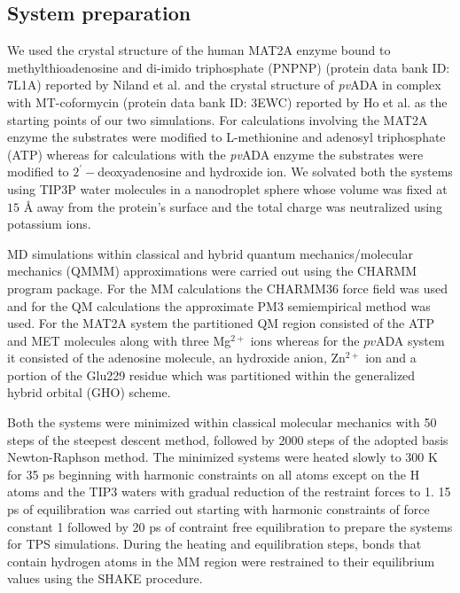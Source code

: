 \documentclass[journal=jpcbfk,manuscript=article,layout=traditional]{achemso}
\begin{document}
\subsection{System preparation}
We used the crystal structure of the human MAT2A enzyme 
bound to methylthioadenosine and di-imido triphosphate (PNPNP)
(protein data bank ID: 7L1A) reported by Niland 
et al. \cite{Niland21Biochem60p791} and the crystal structure of \textit{pv}ADA 
in complex with MT-coformycin (protein data bank ID: 3EWC) reported by Ho et 
al. \cite{Ho09Biochemistry48p9618} as the starting points of our two 
simulations. For calculations involving the MAT2A enzyme the substrates were modified to 
L-methionine and adenosyl triphosphate (ATP) whereas for calculations with the \textit{pv}ADA
enzyme the substrates were modified to $2^{'}-$deoxyadenosine and hydroxide ion. 
We solvated both the systems using TIP3P water molecules 
in a nanodroplet sphere whose volume was fixed at $15$ {\AA}
away from the protein's surface and the total charge was neutralized 
using potassium ions. 

MD simulations within classical and hybrid quantum mechanics/molecular mechanics 
(QMMM) approximations were carried out using the CHARMM program 
package. \cite{Brooks83JComputChem4p187,Brooks09JComputChem30p1545} 
For the MM calculations the CHARMM36 force field \cite{Brooks09JComputChem30p1545} 
was used and for the QM calculations the approximate PM3 semiempirical 
method \cite{Repasky02JComputChem23p1601} was used. 
For the MAT2A system the partitioned QM region consisted of 
the ATP and MET molecules along with three Mg$^{2+}$ ions 
whereas for the $pv$ADA system it consisted of 
the adenosine molecule, an hydroxide anion, Zn$^{2+}$ ion and 
a portion of the Glu229 residue which was partitioned within the generalized 
hybrid orbital (GHO) scheme. \cite{Gao98JPhysChemA102p4714}  

Both the systems were minimized within classical molecular mechanics 
with 50 steps of the
steepest descent method, followed by 2000 steps of the
adopted basis Newton-Raphson method. 
The minimized systems were
heated slowly to 300 K for 35 ps beginning with harmonic
constraints on all atoms except on the H atoms and the TIP3 
waters with gradual reduction of the restraint forces to 1. 
15 ps of equilibration was carried out starting with harmonic 
constraints of force constant 1 followed by 20 ps of contraint free 
equilibration to prepare the systems for TPS simulations. 
During the heating and equilibration steps, bonds that contain 
hydrogen atoms in the MM region were restrained to their equilibrium values 
using the SHAKE procedure. \cite{Ryckaert77JComputPhys23p327} 
 
\end{document}
